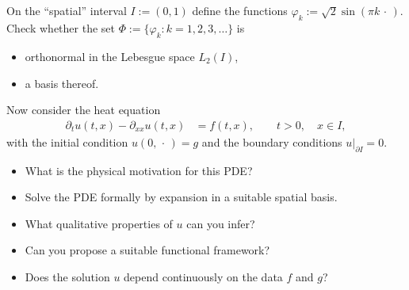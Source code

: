 \documentclass[12pt,a4paper]{article}
\begin{document}
    

    \subsection{}
    
    On the ``spatial'' interval $I := (0, 1)$
    define
    the functions
    $
        \varphi_k := \sqrt{2} \sin(\pi k \,\cdot\,)
    $.
    Check whether the set
    $\Phi := \{ \varphi_k : k = 1, 2, 3, \ldots \}$
    is
    \begin{itemize}
    \item
        orthonormal
        in the Lebesgue space $L_2(I)$,
    \item
        a basis thereof.
    \end{itemize}

    Now consider the heat equation
    \begin{align}
        \partial_t u(t, x) - \partial_{x x} u(t, x)
        & =
        f(t, x),
        \qquad
        t > 0,
        \quad
        x \in I
        ,
    \end{align}
    with the initial condition $u(0, \,\cdot\,) = g$
    and the boundary conditions $u|_{\partial I} = 0$.
    
    \begin{itemize}
    \item
        What is the physical motivation for this PDE?
    \item
        Solve the PDE formally by expansion in a suitable spatial basis.
    \item
        What qualitative properties of $u$ can you infer?
    \item
        Can you propose a suitable functional framework?
    \item
        Does the solution $u$ depend continuously 
        on the data $f$ and $g$?
    \end{itemize}


    \subsection{}
    
\end{document}
